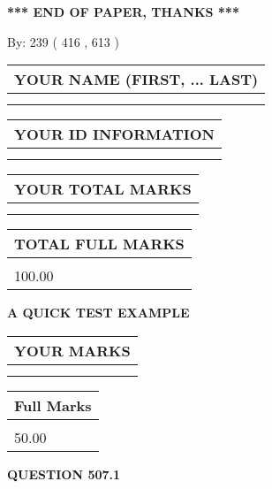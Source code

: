 \documentclass[12pt]{article}
\begin{document}
\vspace{1.0in} 
{\textbf{\large{ *** END OF PAPER, THANKS *** }}} 
   
   
\hspace{1.0in} By: 
 239 ( 416 ,  613 )
   
   
   
   
\newpage 
\setcounter{page}{ 
   507001 } 
   
   
   
   
\noindent\begin{tabular}{|l|}
\hline
YOUR NAME (FIRST, ... LAST)  \\
\hline
 \\ 
 \\ 
\hline
\end{tabular}
\hspace{0.05in} \begin{tabular}{|l|}
\hline
 YOUR   ID   INFORMATION  \\
\hline
 \\ 
 \\ 
\hline
\end{tabular}
   
   
\vspace{0.2in}\noindent\begin{tabular}{|l|}
\hline
YOUR TOTAL MARKS  \\
\hline
 \\ 
 \\ 
\hline
\end{tabular}
\hspace{0.05in} \begin{tabular}{|l|}
\hline
TOTAL FULL MARKS  \\
\hline
 \\ 
100.00 \\
\hline
\end{tabular}
   
   
 \vspace{0.2in}
{\LARGE {\textbf{ A QUICK TEST EXAMPLE}}}
   
   
  
\vspace{0.2in}
  
\noindent\begin{tabular}{|l|}
\hline
 YOUR MARKS  \\
\hline
 \\ 
 \\ 
\hline
\end{tabular}
\hspace{0.05in} \begin{tabular}{|l|}
\hline
 Full Marks  \\
\hline
 \\ 
50.00 \\
\hline
\end{tabular}
{\textbf{\Large{QUESTION
507.1 
}}}
  
\end{document}
